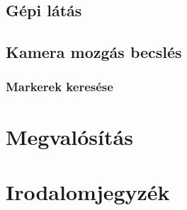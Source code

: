 \documentclass[12pt,a4paper,oneside]{report} %
\begin{document}
\section{Gépi látás}
\section{Kamera mozgás becslés}
\subsection{Markerek keresése}


\chapter{Megvalósítás}


\newpage
\chapter*{Irodalomjegyzék}
\printbibliography[heading=none]
\newpage
\listoffigures
{}
\end{document}
